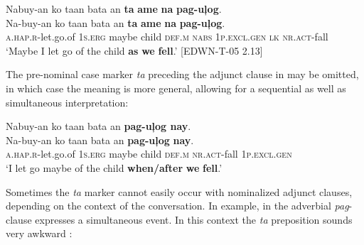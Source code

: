 \ea
\label{bkm:Ref474577376}
Nabuy-an  ko  taan  bata  an  \textbf{ta}  \textbf{ame}  \textbf{na}  \textbf{pag-uļog}. \smallskip\\
\gll Na-buy-an  ko  taan  bata  an  \textbf{ta}  \textbf{ame}  \textbf{na}  \textbf{pag-uļog}. \\
\textsc{a.hap.r}-let.go.of  1\textsc{s.erg}  maybe  child  \textsc{def.m}  \textsc{nabs}  1\textsc{p.excl.gen}  \textsc{lk}  \textsc{nr.act}-fall \\
\glt ‘Maybe I let go of the child \textbf{as} \textbf{we} \textbf{fell}.’ [EDWN-T-05 2.13]
\z

The pre-nominal case marker \textit{ta} preceding the adjunct clause in  may be omitted, in which case the meaning is more general, allowing for a sequential as well as simultaneous interpretation:

\ea
Nabuy-an  ko  taan  bata  an  \textbf{pag-uļog  nay}. \smallskip\\
\gll Na-buy-an  ko  taan  bata  an  \textbf{pag-uļog}  \textbf{nay}. \\
\textsc{a.hap.r}-let.go.of  1\textsc{s.erg}  maybe  child  \textsc{def.m}  \textsc{nr.act}-fall  1\textsc{p.excl.gen} \\
\glt ‘I let go maybe of the child \textbf{when/after} \textbf{we} \textbf{fell}.’
\z

\hspace*{-.4pt}Sometimes the \textit{ta} marker cannot easily occur with nominalized adjunct clauses, depending on the context of the conversation. In example, in  the adverbial \textit{pag}{}- clause expresses a simultaneous event. In this context the \textit{ta} preposition sounds very awkward :

\ea
    \z
\z

